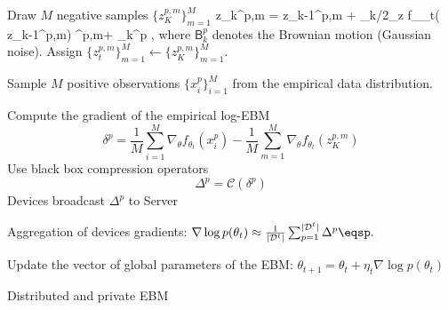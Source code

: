 \documentclass{article}
\begin{document}
\begin{algorithm}[H]
\label{algebm}
\DontPrintSemicolon
  
\hrulefill

{	
	
	{
		{Draw $M$ negative samples $\{ z_{K}^{p,m} \}_{m=1}^M$} 
			{
			\beq\notag
			z_{k}^{p,m} = z_{k-1}^{p,m} + \gamma_k/2\nabla_z f_{\theta_t}( z_{k-1}^{p,m})  ^{p,m}+  _k^p \eqsp,
			\eeq
			where $\mathsf{B}_k^p$ denotes the Brownian motion (Gaussian noise).
			}
		{Assign $\{ z_{t}^{p,m} \}_{m=1}^M \leftarrow \{ z_{K}^{p,m} \}_{m=1}^M$.}
		
		{Sample $M$ positive observations $\{ x^p_{i} \}_{i=1}^M$ from the empirical data distribution.}
		
		{Compute the gradient of the empirical log-EBM} 
		{
		$$\delta^p = \frac{1}{M} \sum_{i=1}^{M} \nabla_{\theta} f_{\theta_t}\left(x^p_{i}\right)- \frac{1}{M} 	\sum_{m=1}^{M} \nabla_{\theta} f_{\theta_t}\left(z_K^{p,m}\right)$$
		}
		{Use black box compression operators}
		{
		$$\Delta^p = \mathcal{C}(\delta^p )$$
		}
		{Devices broadcast $\Delta^p$ to Server} 
	}
	
	  
	{Aggregation of devices gradients: $\nabla \log p(\theta_t) \approx  \frac{1}{|\mathcal{D}^t|} \sum_{p=1}^{|\mathcal{D}^t|} \Delta^p\eqsp.$}

	{Update the vector of global parameters of the EBM: $\theta_{t+1} = \theta_{t} + \eta_t \nabla \log p(\theta_t)$}
}
\caption{Distributed and private EBM}
\end{algorithm}





\end{document}
